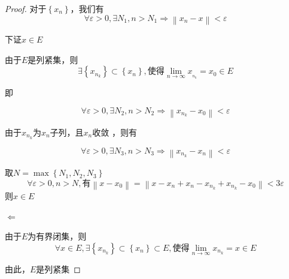 \documentclass[lang=cn,10pt]{elegantbook}
\begin{document}
\begin{proof}
	对于$\left\{ x_n \right\}$，我们有
	\begin{equation*}
		\forall \varepsilon>0 ,\exists N_{1},n>N_{1}\Rightarrow \left\| x_n-x \right\| <\varepsilon
	\end{equation*}
	
	下证$x\in E$
	
	由于$E$是列紧集，则
	\begin{equation*}
		\exists \left\{ x_{n_{k}} \right\}\subset\left\{ x_n \right\},\text{使得}\underset{n\rightarrow \infty}{\lim}x_{_{n_{k}}}=x_{0}\in E
	\end{equation*}
	
	即
	
	\begin{equation*}
		\forall \varepsilon>0 ,\exists N_{2},n>N_{2}\Rightarrow \left\| x_{n_{k}}-x_{0} \right\| <\varepsilon
	\end{equation*}
	
	由于$x_{n_{k}}$为$x_{n}$子列，且$x_{n}$收敛
	，则有
	
	\begin{equation*}
		\forall \varepsilon>0 ,\exists N_{3},n>N_{3}\Rightarrow \left\| x_{n_{k}}-x_{n} \right\| <\varepsilon
	\end{equation*}
	
	取$N=\max \left\{ N_1,N_2,N_3 \right\} $
	\begin{equation*}
		\forall \varepsilon >0,n>N,\text{有}\left\| x-x_0 \right\| =\left\| x-x_n+x_n-x_{n_k}+x_{n_k}-x_0 \right\| <3\varepsilon 
	\end{equation*}
	则$x\in E$
	
	$\Leftarrow$
	
	由于$E$为有界闭集，则
	\begin{equation*}
		\forall x\in E,\exists \left\{ x_{n_k} \right\} \subset \left\{ x_n \right\} \subset E,\text{使得}\underset{n\rightarrow \infty}{\lim}x_{n_k}=x\in E
	\end{equation*}
	
	由此，$E$是列紧集
\end{proof}
\begin{definition}
	$\text{设}E\subset \mathbb{R} ^n\text{，}\mathcal{G} =\left\{ G_{\alpha} \right\} \text{为}\mathbb{R} ^n\text{中的一个开集族，如果}$
	\begin{equation*}
		E\subset\bigcup_{\alpha}{G_{\alpha}}
	\end{equation*}
	则称开集族 }$\mathcal{G}$覆盖了 $E$，或者称 }$\mathcal{G}$ 是 $E$ 的一个开覆盖
\end{definition}
\end{document}
